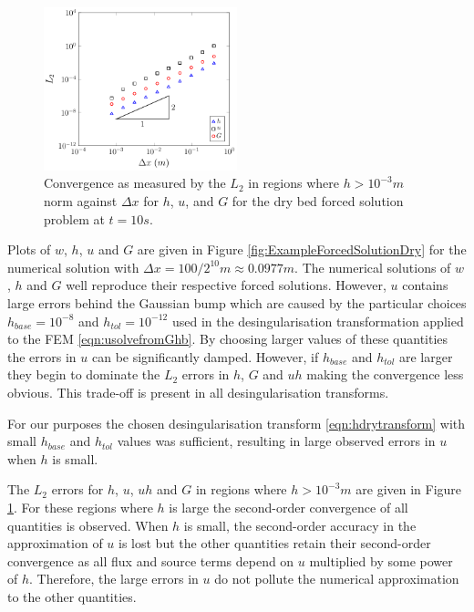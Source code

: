\documentclass[times]{elsarticle}
\begin{document}
\begin{figure}
	\centering
		\includegraphics[width=0.5\textwidth]{./Figures/Forced/Dry/L2red.pdf}
	\caption{Convergence as measured by the $L_2$ in regions where $h > 10^{-3}m$ norm against $\Delta x$ for $h$, $u$, and $G$ for the dry bed forced solution problem at $t=10s$.}
	\label{fig:L1convergenceforcedWet}
\end{figure}

Plots of $w$, $h$, $u$ and $G$ are given in Figure \ref{fig:ExampleForcedSolutionDry} for the numerical solution with $\Delta x = 100 / 2^{10}m\approx 0.0977m$. The numerical solutions of $w$, $h$ and $G$ well reproduce their respective forced solutions. However, $u$ contains large errors behind the Gaussian bump which are caused by the particular choices $h_{{base}} = 10^{-8}$ and $h_{{tol}} = 10^{-12}$ used in the desingularisation transformation applied to the FEM \eqref{eqn:usolvefromGhb}. By choosing larger values of these quantities the errors in $u$ can be significantly damped. However, if $h_{{base}}$ and $h_{{tol}}$ are larger they begin to dominate the $L_2$ errors in $h$, $G$ and $uh$ making the convergence less obvious. This trade-off is present in all desingularisation transforms. 

For our purposes the chosen desingularisation transform \eqref{eqn:hdrytransform} with small $h_{{base}}$ and $h_{{tol}}$ values was sufficient, resulting in large observed errors in $u$ when $h$ is small.

The $L_2$ errors for $h$, $u$, $uh$ and $G$ in regions where $h > 10^{-3} m$ are given in Figure \ref{fig:L1convergenceforcedWet}. For these regions where $h$ is large the second-order convergence of all quantities is observed. When $h$ is small, the second-order accuracy in the approximation of $u$ is lost but the other quantities retain their second-order convergence as all flux and source terms depend on $u$ multiplied by some power of $h$. Therefore, the large errors in $u$ do not pollute the numerical approximation to the other quantities.
\end{document}
